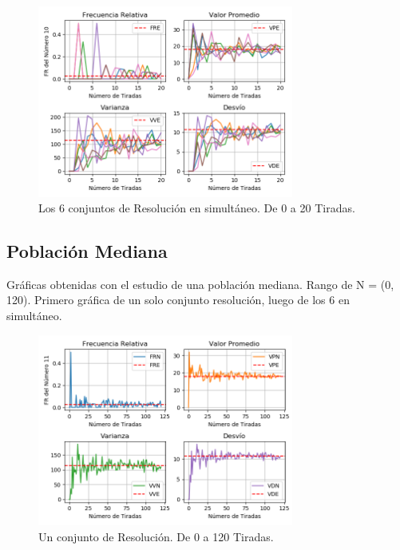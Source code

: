\documentclass[a4paper]{article}
\begin{document}
\begin{figure}[H]
    \centering
    \includegraphics[width=0.75\textwidth]{./graphs/multi_graph_iterations_20.png}
    \caption{\label{fig:img2}Los 6 conjuntos de Resolución en simultáneo. De 0 a 20 Tiradas.}
\end{figure}

\subsection{Población Mediana}
\label{sec:pobmed}

Gráficas obtenidas con el estudio de una población mediana. Rango de N = (0, 120). Primero gráfica de un solo conjunto resolución, luego de los 6 en simultáneo.

\begin{figure}[H]
    \centering
    \includegraphics[width=0.75\textwidth]{./graphs/graph_iterations_120.png}
    \caption{\label{fig:img3}Un conjunto de Resolución. De 0 a 120 Tiradas.}
\end{figure}
\end{document}
